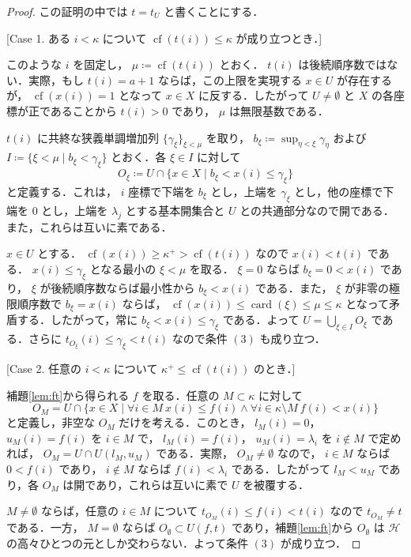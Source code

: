 \documentclass[leqno, 12pt]{ltjsarticle}
\newcommand{\basicopen}[2]{U(#1,#2)}
\newcommand{\kappasucc}{\kappa^{+}}
\DeclareMathOperator{\card}{card}
\DeclareMathOperator{\cf}{cf}
\begin{document}
\begin{proof}
この証明の中では
$t=t_{U}$
と書くことにする．

[Case 1. ある
$i<\kappa$
について
$\cf(t(i))\le\kappa$
が成り立つとき．]

このような
$i$
を固定し，
$\mu\coloneqq\cf(t(i))$
とおく．
$t(i)$
は後続順序数ではない．実際，もし
$t(i)=a+1$
ならば，この上限を実現する
$x\in U$
が存在するが，
$\cf(x(i))=1$
となって
$x\in X$
に反する．したがって
$U\neq\emptyset$
と
$X$
の各座標が正であることから
$t(i)>0$
であり，
$\mu$
は無限基数である．

$t(i)$
に共終な狭義単調増加列
$\{\gamma_{\xi}\}_{\xi<\mu}$
を取り，
$b_{\xi}\coloneqq\sup_{\eta<\xi}\gamma_{\eta}$
および
$I\coloneqq\{\xi<\mu \mid b_{\xi}<\gamma_{\xi}\}$
とおく．各
$\xi\in I$
に対して
\[
O_{\xi}\coloneqq U\cap\{x\in X \mid b_{\xi}<x(i)\le\gamma_{\xi}\}
\]
と定義する．これは，
$i$
座標で下端を
$b_{\xi}$
とし，上端を
$\gamma_{\xi}$
とし，他の座標で下端を
$0$
とし，上端を
$\lambda_{j}$
とする基本開集合と
$U$
との共通部分なので開である．また，これらは互いに素である．

$x\in U$
とする．
$\cf(x(i))\ge\kappasucc>\cf(t(i))$
なので
$x(i)<t(i)$
である．
$x(i)\le\gamma_{\xi}$
となる最小の
$\xi<\mu$
を取る．
$\xi=0$
ならば
$b_{\xi}=0<x(i)$
であり，
$\xi$
が後続順序数ならば最小性から
$b_{\xi}<x(i)$
である．また，
$\xi$
が非零の極限順序数で
$b_{\xi}=x(i)$
ならば，
$\cf(x(i))\le\card(\xi)\le\mu\le\kappa$
となって矛盾する．したがって，常に
$b_{\xi}<x(i)\le\gamma_{\xi}$
である．よって
$U=\bigcup_{\xi\in I}O_{\xi}$
である．さらに
$t_{O_{\xi}}(i)\le\gamma_{\xi}<t(i)$
なので条件
$(3)$
も成り立つ．

[Case 2. 任意の
$i<\kappa$
について
$\kappasucc\le\cf(t(i))$
のとき．]

補題\ref{lem:ft}から得られる
$f$
を取る．任意の
$M\subset\kappa$
に対して
\[
O_{M}=U\cap\{x\in X \mid \forall i\in M\ x(i)\le f(i)\land
\forall i\in\kappa\setminus M\ f(i)<x(i)\}
\]
と定義し，非空な
$O_{M}$
だけを考える．このとき，
$l_{M}(i)=0$，
$u_{M}(i)=f(i)$
を
$i\in M$
で，
$l_{M}(i)=f(i)$，
$u_{M}(i)=\lambda_{i}$
を
$i\notin M$
で定めれば，
$O_{M}=U\cap\basicopen{l_{M}}{u_{M}}$
である．実際，
$O_{M}\neq\emptyset$
なので，
$i\in M$
ならば
$0<f(i)$
であり，
$i\notin M$
ならば
$f(i)<\lambda_{i}$
である．したがって
$l_{M}<u_{M}$
であり，各
$O_{M}$
は開であり，これらは互いに素で
$U$
を被覆する．

$M\neq\emptyset$
ならば，任意の
$i\in M$
について
$t_{O_{M}}(i)\le f(i)<t(i)$
なので
$t_{O_{M}}\neq t$
である．一方，
$M=\emptyset$
ならば
$O_{\emptyset}\subset\basicopen{f}{t}$
であり，補題\ref{lem:ft}から
$O_{\emptyset}$
は
$\mathcal{H}$
の高々ひとつの元としか交わらない．よって条件
$(3)$
が成り立つ．

\end{proof}
\end{document}
